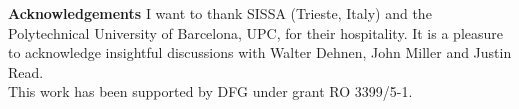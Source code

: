 \documentclass{elsart}
\begin{document}
{\bf Acknowledgements}
I want to thank SISSA (Trieste, Italy) and the Polytechnical University of Barcelona, UPC, for their
hospitality. It is a pleasure to acknowledge insightful discussions with Walter Dehnen, John Miller 
and Justin Read. \\
This work has been supported by DFG under grant RO 3399/5-1.


















%












\end{document}
